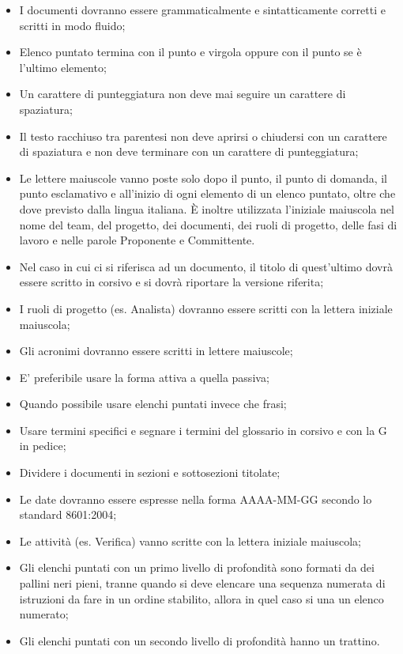 \begin{itemize}
\item I documenti dovranno essere grammaticalmente e sintatticamente corretti e scritti in modo fluido;
\item Elenco puntato termina con il punto e virgola oppure con il punto se è l'ultimo elemento;
\item Un carattere di punteggiatura non deve mai seguire un carattere di spaziatura;
\item Il testo racchiuso tra parentesi non deve aprirsi o chiudersi con un carattere di spaziatura e non deve terminare con un carattere di punteggiatura;
\item Le lettere maiuscole vanno poste solo dopo il punto, il punto di domanda, il punto esclamativo e all'inizio di ogni elemento di un elenco puntato, oltre che dove previsto dalla lingua italiana. È inoltre utilizzata l'iniziale maiuscola nel nome del team, del progetto, dei documenti, dei ruoli di progetto, delle fasi di lavoro e nelle parole Proponente e Committente.
\item Nel caso in cui ci si riferisca ad un documento, il titolo di quest'ultimo dovrà essere scritto in corsivo e si dovrà riportare la versione riferita;
\item I ruoli di progetto (es. Analista) dovranno essere scritti con la lettera iniziale maiuscola;
\item Gli acronimi dovranno essere scritti in lettere maiuscole;
\item E' preferibile usare la forma attiva a quella passiva;
\item Quando possibile usare elenchi puntati invece che frasi;
\item Usare termini specifici e segnare i termini del glossario in corsivo e con la G in pedice;
\item Dividere i documenti in sezioni e sottosezioni titolate;
\item Le date dovranno essere espresse nella forma AAAA-MM-GG secondo lo standard  8601:2004;
\item Le attività (es. Verifica) vanno scritte con la lettera iniziale maiuscola;
\item Gli elenchi puntati con un primo livello di profondità sono formati da dei pallini neri pieni, tranne quando si deve
elencare una sequenza numerata di istruzioni da fare in un ordine stabilito, allora in quel caso si una un elenco numerato; \item Gli elenchi puntati con un secondo livello di profondità hanno un trattino.
\end{itemize}

